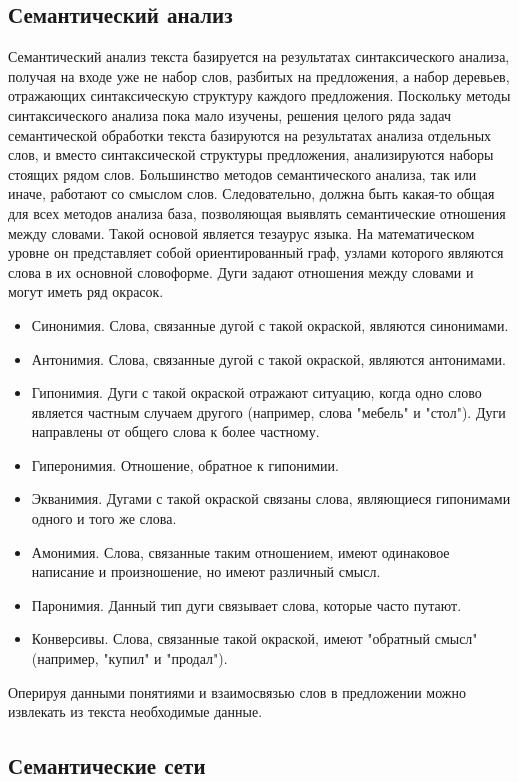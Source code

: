 \subsection{Семантический анализ}
Семантический анализ текста базируется на результатах синтаксического анализа, получая на входе уже не набор слов, разбитых на предложения, а набор деревьев, отражающих синтаксическую структуру каждого предложения. Поскольку методы синтаксического анализа пока мало изучены, решения целого ряда задач семантической обработки текста базируются на результатах анализа отдельных слов, и вместо синтаксической структуры предложения, анализируются наборы стоящих рядом слов.
Большинство методов семантического анализа, так или иначе, работают со смыслом слов. Следовательно, должна быть какая-то общая для всех методов анализа база, позволяющая выявлять семантические отношения между словами. Такой основой является тезаурус языка. На математическом уровне он представляет собой ориентированный граф, узлами которого являются слова в их основной словоформе. Дуги задают отношения между словами и могут иметь ряд окрасок.\\
\begin{itemize}
\item Синонимия. Слова, связанные дугой с такой окраской, являются синонимами.
\item Антонимия. Слова, связанные дугой с такой окраской, являются антонимами.
\item Гипонимия. Дуги с такой окраской отражают ситуацию, когда одно слово является частным случаем другого (например, слова "мебель" и "стол"). Дуги направлены от общего слова к более частному.
\item Гиперонимия. Отношение, обратное к гипонимии.
\item Экванимия. Дугами с такой окраской связаны слова, являющиеся гипонимами одного и того же слова.
\item Амонимия. Слова, связанные таким отношением, имеют одинаковое написание и произношение, но имеют различный смысл.
\item Паронимия. Данный тип дуги связывает слова, которые часто путают.
\item Конверсивы. Слова, связанные такой окраской, имеют "обратный смысл" (например, "купил" и "продал").
\end{itemize}
\cite{Kling}
Оперируя данными понятиями и взаимосвязью слов в предложении можно извлекать из текста необходимые данные.
\subsection{Семантические сети}
